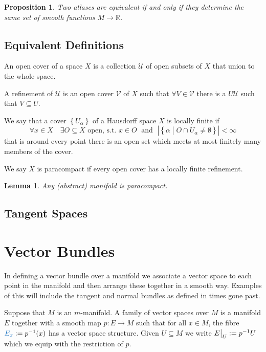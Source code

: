 \documentclass[11pt]{article}
\newcommand{\defeq}{:=}
\newcommand{\relmiddle}[1]{\mathrel{}\middle#1\mathrel{}}
\newcommand{\rmv}{\relmiddle|}
\newcommand\restr[2]{{%
  \left.\kern-\nulldelimiterspace %
  #1 %
  \vphantom{\big|} %
  \right|_{#2} %
  }}
\newcommand{\R}{\mathbb{R}}
\newenvironment{defin}
	{\begin{mdframed}[backgroundcolor=white, roundcorner=5pt, linewidth=1pt, linecolor=RoyalBlue]
		\setlength{\parindent}{0pt}}
	{\end{mdframed}}
\newcommand{\mdf}[1]{{\color{RoyalBlue} #1}}
\newtheorem{lemma}[theorem]{Lemma}
\newtheorem{prop}[theorem]{Proposition}
\begin{document}
\begin{prop}
Two atlases are equivalent if and only if they determine the same set of smooth functions $M\to \R$.
\end{prop}

\subsection{Equivalent Definitions}
\begin{defin}
An \mdf{open cover} of a space $X$ is a collection $\mathcal{U}$ of open subsets of $X$ that union to the whole space.

A \mdf{refinement} of $\mathcal{U}$ is an open cover $\mathcal{V}$ of $X$ such that $\forall V\in \mathcal{V}$ there is a $U\mathcal{U}$ such that $V\subseteq U$.

We say that a cover $\left\{ U_\alpha\right\}$ of a Hausdorff space $X$ is \mdf{locally finite} if
\[
	\forall x \in X \quad \exists O\subseteq X\text{ open, s.t. }x\in O \; \text{ and } \; \left|\left\{ \alpha \rmv O\cap U_\alpha\neq\emptyset\right\}\right|< \infty
\]
that is around every point there is an open set which meets at most finitely many members of the cover.

We say $X$ is \mdf{paracompact} if every open cover has a locally finite refinement.
\end{defin}

\begin{lemma}
Any (abstract) manifold is paracompact.
\end{lemma}

\subsection{Tangent Spaces}



\section{Vector Bundles}
In defining a vector bundle over a manifold we associate a vector space to each point in the manifold and then arrange these together in a smooth way.
Examples of this will include the tangent and normal bundles as defined in times gone past.

Suppose that $M$ is an $m$-manifold.
A \mdf{family of vector spaces} over $M$ is a manifold $E$ together with a smooth map $p:E\to M$ such that for all $x\in M$, the \mdf{fibre} $\mdf{E_x}\defeq p^{-1}(x)$ has a vector space structure.
Given $U\subseteq M$ we write $\restr{E}{U}\defeq p^{-1}U$ which we equip with the restriction of $p$.
\end{document}
